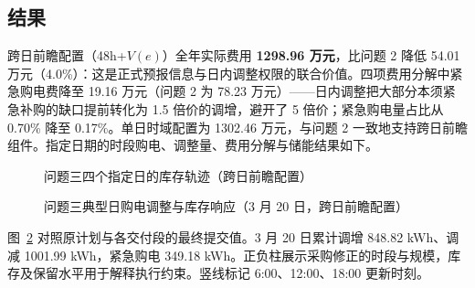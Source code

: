 \subsection{结果}
跨日前瞻配置（48h+$V(e)$）全年实际费用 \textbf{1298.96 万元}，比问题 2 降低 54.01 万元（4.0\%）：这是正式预报信息与日内调整权限的联合价值。四项费用分解中紧急购电费降至 19.16 万元（问题 2 为 78.23 万元）——日内调整把大部分本须紧急补购的缺口提前转化为 1.5 倍价的调增，避开了 5 倍价；紧急购电量占比从 0.70\% 降至 0.17\%。单日时域配置为 1302.46 万元，与问题 2 一致地支持跨日前瞻组件。指定日期的时段购电、调整量、费用分解与储能结果如下。


\FloatBarrier

\begin{figure}[!htbp]\centering
{}
\caption{问题三四个指定日的库存轨迹（跨日前瞻配置）}\label{fig:fig_f16_q3_soc}
\end{figure}

\begin{figure}[!htbp]\centering
{}
\caption{问题三典型日购电调整与库存响应（3 月 20 日，跨日前瞻配置）}\label{fig:fig_f12_exec_day}
\end{figure}

图~\ref{fig:fig_f12_exec_day} 对照原计划与各交付段的最终提交值。3 月 20 日累计调增 848.82 kWh、调减 1001.99 kWh，紧急购电 349.18 kWh。正负柱展示采购修正的时段与规模，库存及保留水平用于解释执行约束。竖线标记 6:00、12:00、18:00 更新时刻。
